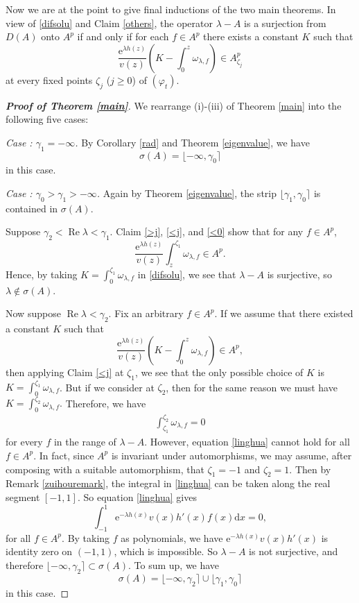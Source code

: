 \documentclass{amsart}
\theoremstyle{proclaim}
\theoremstyle{fancyproclaim}
\theoremstyle{definition}
\theoremstyle{fancystatement}
\numberwithin{equation}{section}
\begin{document}
Now we are at the point to give final inductions of the two main theorems.  In view of \eqref{difsolu} and Claim \ref{others}, the operator $\lambda-A$ is a surjection from $D(A)$ onto $A^p$ if and only if for each $f\in A^p$ there exists a constant $K$ such that
$$\frac{ \mathrm{e}^{\lambda h(z)}}{v(z)}\left(K-\int_0^z \omega_{\lambda,f}\right)\in A^p_{\zeta_j}$$
at every fixed points $\zeta_j$ ($j\geq 0$) of $(\varphi_t)$.


\begin{proof}[\textbf{Proof of Theorem \ref{main}}]
We rearrange (i)-(iii) of Theorem \ref{main} into the following five cases:

\noindent\emph{ Case \uppercase\expandafter{}: $\gamma_1=-\infty$.} By Corollary \ref{rad} and Theorem \ref{eigenvalue}, we have
$$\sigma(A)=\lfloor-\infty, \gamma_0\rceil$$
in this case.



\noindent\emph{ Case \uppercase\expandafter{}: $\gamma_0>\gamma_1>-\infty$.} Again by Theorem \ref{eigenvalue}, the strip $\lfloor\gamma_1, \gamma_0\rceil$ is contained in $\sigma(A).$

Suppose $\gamma_2<\operatorname{Re}\lambda<\gamma_1$. Claim \ref{>j}, \ref{<j}, and \ref{<0} show that for any $f\in A^p$,
$$\frac{ \mathrm{e}^{\lambda h(z)}}{v(z)}\int_z^{\zeta_1} \omega_{\lambda,f}\in A^p.$$
Hence, by taking $K=\int_0^{\zeta_1} \omega_{\lambda,f}$ in \eqref{difsolu}, we see that $\lambda-A$ is surjective, so $\lambda\notin\sigma(A)$.

Now suppose $\operatorname{Re}\lambda<\gamma_2$. Fix an arbitrary $f\in A^p$. If we assume that there existed a constant $K$ such that
$$\frac{ \mathrm{e}^{\lambda h(z)}}{v(z)}\left(K-\int_0^z \omega_{\lambda,f}\right)\in A^p,$$
then applying Claim \ref{<j} at $\zeta_1$, we see that the only possible choice of $K$ is $K=\int_0^{\zeta_1} \omega_{\lambda,f}$. But if we consider at  $\zeta_2$, then for the same reason we must have $K=\int_0^{\zeta_2} \omega_{\lambda,f}.$ Therefore, we have 
\begin{align}\label{linghua}
\int_{\zeta_1}^{\zeta_2} \omega_{\lambda,f}=0
\end{align}
for every $f$ in the range of $\lambda-A$. However, equation \eqref{linghua} cannot hold for all $f\in A^p$. In fact,  since $A^p$ is invariant under automorphisms, we may assume, after composing with a suitable automorphism, that $\zeta_1=-1$ and $\zeta_2=1$. Then by Remark \ref{zuihouremark}, the integral in \eqref{linghua} can be taken along the real segment $[-1,1]$. So equation \eqref{linghua} gives
$$\int_{-1}^{1} \mathrm{e}^{-\lambda h(x)}v(x)h'(x)f(x)\mathrm{d}x=0,$$
for all $f\in A^p$. By taking $f$ as polynomials, we have $\mathrm{e}^{-\lambda h(x)}v(x)h'(x)$ is identity zero on $(-1,1)$, which is  impossible. So $\lambda-A$ is not surjective, and therefore $\lfloor-\infty, \gamma_2\rceil\subset\sigma(A)$. To sum up, we have 
$$\sigma(A)=\lfloor-\infty, \gamma_2\rceil\cup\lfloor\gamma_1, \gamma_0\rceil$$
in this case.








\end{proof}
\end{document}
